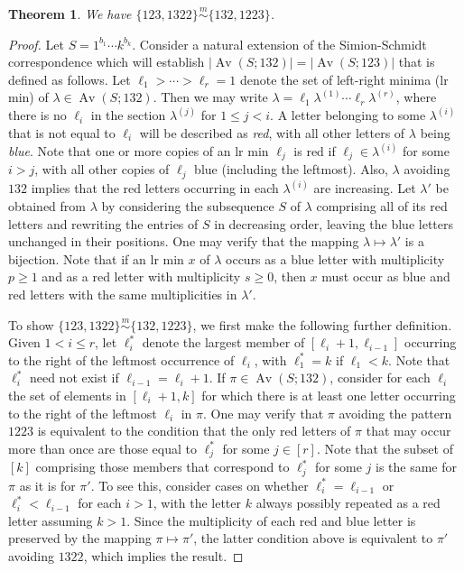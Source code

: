 \documentclass[11pt]{amsart}
\theoremstyle{plain}
\newtheorem{theorem}{Theorem}[section]
\theoremstyle{definition}
\newcommand{\csim}{\stackrel{m}{\sim}}
\DeclareMathOperator{\Av}{Av}
\begin{document}
\begin{theorem}\label{123,1222}
 We have $\{123,1322\}\csim\{132,1223\}$.
\end{theorem}
\begin{proof}
Let $S=1^{b_1}\cdots k^{b_k}$. Consider a natural extension of the Simion-Schmidt correspondence
\cite{SS} which will establish $|\Av(S;132)|=|\Av(S;123)|$ that is defined as follows.  Let
$\ell_1>\cdots>\ell_r=1$ denote the set of left-right minima (lr min) of $\lambda \in \Av(S;132)$.
Then we may write $\lambda=\ell_1\lambda^{(1)}\cdots \ell_r\lambda^{(r)}$, where there is no $\ell_i$
in the section $\lambda^{(j)}$ for $1 \leq j <i$.  A letter belonging to some $\lambda^{(i)}$ that is
not equal to $\ell_i$ will be described as \emph{red}, with all other letters of $\lambda$ being
\emph{blue}.  Note that  one or more copies of an lr min $\ell_j$ is red if $\ell_j \in
\lambda^{(i)}$ for some $i>j$, with all other copies of $\ell_j$ blue (including the leftmost).
Also, $\lambda$ avoiding $132$ implies that the red letters occurring in each $\lambda^{(i)}$ are
increasing.  Let $\lambda'$ be obtained from $\lambda$ by considering the subsequence $S$ of
$\lambda$ comprising all of its red letters and rewriting the entries of $S$ in decreasing order,
leaving the blue letters unchanged in their positions.  One may verify that the mapping $\lambda
\mapsto \lambda'$ is a bijection.  Note that if an lr min $x$ of $\lambda$ occurs as a blue letter
with multiplicity $p \geq 1$ and as a red letter with multiplicity $s \geq 0$, then $x$ must occur as
blue and red letters with the same multiplicities in $\lambda'$.

To show $\{123,1322\}\csim\{132,1223\}$, we first make the following further definition.  Given $1 <
i \leq r$, let $\ell_i^*$ denote the largest member of $[\ell_i+1,\ell_{i-1}]$ occurring to the right
of the leftmost occurrence of $\ell_i$, with $\ell_1^*=k$ if $\ell_1<k$.  Note that $\ell_i^*$ need
not exist if $\ell_{i-1}=\ell_{i}+1$.  If $\pi \in \Av(S;132)$, consider for each $\ell_i$ the set
of elements in $[\ell_i+1,k]$ for which there is at least one letter occurring to the right of the
leftmost $\ell_i$ in $\pi$.  One may verify that $\pi$ avoiding the pattern $1223$ is equivalent to
the condition that the only red letters of $\pi$ that may occur more than once are those equal to
$\ell_j^*$ for some $j \in [r]$.  Note that the subset of $[k]$ comprising those members that
correspond to $\ell_j^*$ for some $j$ is the same for $\pi$ as it is for $\pi'$.  To see this,
consider cases on whether $\ell_i^*=\ell_{i-1}$ or $\ell_i^*<\ell_{i-1}$ for each $i>1$, with the
letter $k$ always possibly repeated as a red letter assuming $k>1$.  Since the multiplicity of each
red and blue letter is preserved by the mapping $\pi \mapsto \pi'$, the latter condition above is
equivalent to $\pi'$ avoiding $1322$, which implies the result.
\end{proof}
\end{document}
